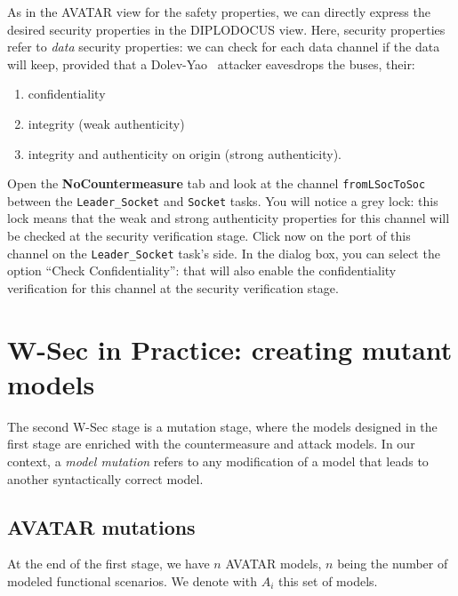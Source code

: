 \documentclass{article}
\begin{document}
As in the AVATAR view for the safety properties, we can directly express the desired security properties in the DIPLODOCUS view. Here, security properties refer to \emph{data} security properties: we can check for each data channel if the data will keep, provided that a Dolev-Yao~\cite{dolevyao} attacker eavesdrops the buses, their:
\begin{enumerate}
	\item confidentiality
	\item integrity (weak authenticity)
	\item integrity and authenticity on origin (strong authenticity).
\end{enumerate}
Open the \textbf{NoCountermeasure} tab and look at the channel \texttt{fromLSocToSoc} between the \texttt{Leader\_Socket} and \texttt{Socket} tasks. You will notice a grey lock: this lock means that the weak and strong authenticity properties for this channel will be checked at the security verification stage. Click now on the port of this channel on the \texttt{Leader\_Socket} task's side. In the dialog box, you can select the option ``Check Confidentiality'': that will also enable the confidentiality verification for this channel at the security verification stage.



\section{W-Sec in Practice: creating mutant models}

The second W-Sec stage is a mutation stage, where the models designed in the first stage are enriched with the countermeasure and attack models. In our context, a \emph{model mutation} refers to any modification of a model that leads to another syntactically correct model.

\subsection{AVATAR mutations}

At the end of the first stage, we have $n$ AVATAR models, $n$ being the number of modeled functional scenarios. We denote with $A_i$ this set of models.
\end{document}
